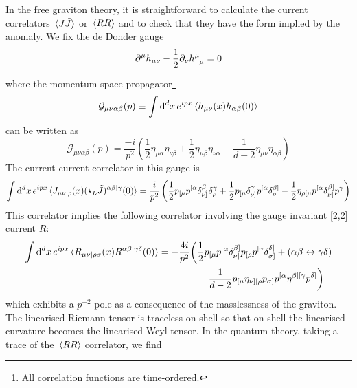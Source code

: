 In the free graviton theory, it is straightforward to calculate the current correlators $\ev*{J \tilde{J}}$ or $\ev*{RR}$ and to check that they have the form implied by the anomaly. We fix the de Donder gauge
\begin{equation}
    \partial^\mu h_{\mu\nu} - \frac{1}{2}\partial_\nu h\indices{^\mu_\mu} = 0
\end{equation}
where the momentum space propagator\footnote{All correlation functions are time-ordered.}
\begin{equation}
    \mathcal{G}_{\mu\nu\alpha\beta}(p) \equiv \int \dd[d]{x} e^{ipx} \ev*{h_{\mu\nu}(x) h_{\alpha\beta}(0)} 
\end{equation}
can be written as \cite{Hinterbichler:2011tt}
\begin{equation}
    \mathcal{G}_{\mu\nu\alpha\beta}(p) = \frac{-i}{p^2} \left( \frac{1}{2} \eta_{\mu\alpha}\eta_{\nu\beta} + \frac{1}{2} \eta_{\mu\beta} \eta_{\nu\alpha} - \frac{1}{d-2} \eta_{\mu\nu} \eta_{\alpha\beta} \right)
\end{equation}
The current-current correlator in this gauge is
\begin{equation}\label{eq:JJ_correlator}
    \int \dd[d]{x} e^{ipx} \ev*{J_{\mu\nu|\rho}(x) (\star_L \tilde{J})^{\alpha\beta|\gamma}(0)} = \frac{i}{p^2} \left( \frac{1}{2} p_{[\mu} p^{[\alpha} \delta^{\beta]}_{\nu]} \delta^\gamma_\rho + \frac{1}{2} p_{[\mu} \delta_{\nu]}^\gamma p^{[\alpha} \delta^{\beta]}_\rho - \frac{1}{2} \eta_{\rho[\mu} p^{[\alpha} \delta^{\beta]}_{\nu]} p^\gamma \right)
\end{equation}
This correlator implies the following correlator involving the gauge invariant [2,2] current $R$:
\begin{equation}
\begin{split}\label{eq:XY_correlator}
    \int \dd[d]{x} e^{ipx} \ev*{R_{\mu\nu|\rho\sigma}(x) R^{\alpha\beta|\gamma\delta}(0)} &= -\frac{4i}{p^2} \bigg( \frac{1}{2} p_{[\mu} p^{[\alpha} \delta^{\beta]}_{\nu]} p_{[\rho} p^{[\gamma} \delta^{\delta]}_{\sigma]} + (\alpha\beta\leftrightarrow\gamma\delta) \\
    &\qquad\qquad - \frac{1}{d-2} p_{[\mu} \eta_{\nu][\rho} p_{\sigma]} p^{[\alpha} \eta^{\beta][\gamma}p^{\delta]} \bigg)
\end{split}
\end{equation}
which exhibits a $p^{-2}$ pole as a consequence of the masslessness of the graviton.
The linearised Riemann tensor is traceless on-shell so that on-shell the linearised curvature becomes the linearised Weyl tensor. In the quantum theory, taking a trace of the $\ev*{RR}$ correlator, we find
